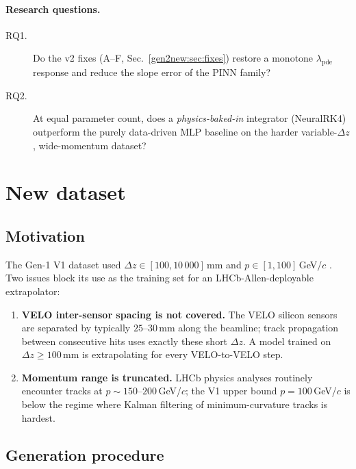 \documentclass[a4paper,11pt]{article}
\newcommand{\dz}{\Delta z}
\begin{document}
\paragraph{Research questions.}
\begin{description}
\item[RQ1.] Do the v2 fixes (A--F, Sec.~\ref{gen2new:sec:fixes})
  restore a monotone $\lambda_{\mathrm{pde}}$ response and reduce the
  slope error of the PINN family?
\item[RQ2.] At equal parameter count, does a
  \emph{physics-baked-in} integrator (NeuralRK4) outperform the
  purely data-driven MLP baseline on the harder variable-$\dz$,
  wide-momentum dataset?
\end{description}

\section{New dataset}\label{gen2new:sec:data}

\subsection{Motivation}

The Gen-1 V1 dataset used $\dz\in[100,10\,000]$\,mm and
$p\in[1,100]$\,GeV/$c$ \cite{gen1report}. Two issues block its use
as the training set for an LHCb-Allen-deployable extrapolator:

\begin{enumerate}
\item \textbf{VELO inter-sensor spacing is not covered.} The VELO
  silicon sensors are separated by typically $25$--$30$\,mm along the
  beamline; track propagation between consecutive hits uses exactly
  these short $\dz$. A model trained on $\dz\geq 100$\,mm is
  extrapolating for every VELO-to-VELO step.
\item \textbf{Momentum range is truncated.} LHCb physics analyses
  routinely encounter tracks at $p\sim150$--$200$\,GeV/$c$; the V1
  upper bound $p=100$\,GeV/$c$ is below the regime where Kalman
  filtering of minimum-curvature tracks is hardest.
\end{enumerate}

\subsection{Generation procedure}
\end{document}

